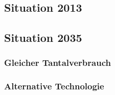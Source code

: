 \subsection{Situation 2013}

\subsection{Situation 2035}

\subsubsection{Gleicher Tantalverbrauch}

\subsubsection{Alternative Technologie}

